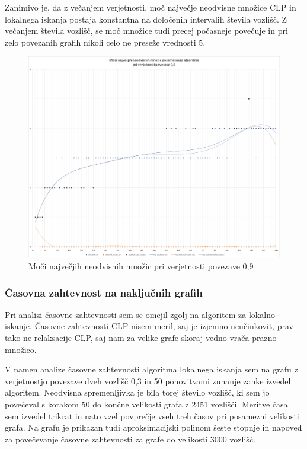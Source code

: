 \documentclass[a4paper, 12 pt]{article}
\theoremstyle{definition}
\theoremstyle{plain}
\theoremstyle{remark}
\begin{document}
Zanimivo je, da z večanjem verjetnosti, moč največje neodvisne množice CLP in lokalnega iskanja postaja konstantna na določenih intervalih števila vozlišč. Z večanjem števila vozlišč, se moč množice tudi precej počasneje povečuje in pri zelo povezanih grafih nikoli celo ne preseže vrednosti 5.


\begin{figure}[H]
\centering
  \includegraphics[scale=0.28]{0,9 moci.png}
  \caption{Moči največjih neodvisnih množic pri verjetnosti povezave 0,9}
  \label{fig:moc0,9} 
\end{figure}

\subsubsection{Časovna zahtevnost na naključnih grafih} %
Pri analizi časovne zahtevnosti sem se omejil zgolj na algoritem za lokalno iskanje. Časovne zahtevnosti CLP nisem meril, saj je izjemno neučinkovit,  prav tako ne relaksacije CLP, saj nam za velike grafe skoraj vedno vrača prazno množico.

V namen analize časovne zahtevnosti algoritma lokalnega iskanja sem na grafu z verjetnostjo povezave dveh vozlišč 0,3 in 50 ponovitvami zunanje zanke izvedel algoritem. Neodvisna spremenljivka je bila torej število vozlišč, ki sem jo povečeval s korakom 50 do končne velikosti grafa z 2451 vozlišči. Meritve časa sem izvedel trikrat in nato vzel povprečje vseh treh časov pri posamezni velikosti grafa. Na grafu je prikazan tudi aproksimacijski polinom šeste stopnje in napoved za povečevanje časovne zahtevnosti za grafe do velikosti 3000 vozlišč.
\end{document}
